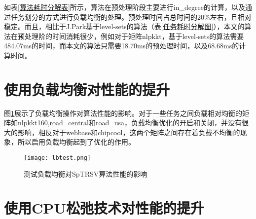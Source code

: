 \begin{table}[htbp]
    \scriptsize
    \caption{算法耗时分解表}
    \label{算法耗时分解表}
\end{table}

如表\ref{算法耗时分解表}所示，算法在预处理阶段主要进行in\_degree的计算，以及通过任务划分的方式进行负载均衡的处理。预处理时间占总时间的20\%左右，且相对稳定。而且，相比于J.Park\cite{park2014sparsifying}基于level-sets的算法（表\ref{任务耗时分解图}），本文的算法在预处理阶的时间消耗很少，例如对于矩阵nlpkkt，基于level-sets的算法需要484.07ms的时间，而本文的算法只需要18.70ms的预处理时间，以及68.68ms的计算时间。


\section{使用负载均衡对性能的提升}

图\ref{测试负载均衡对SpTRSV算法性能的影响}展示了负载均衡操作对算法性能的影响。对于一些任务之间负载相对均衡的矩阵如nlpkkt160,road\_central和road\_usa，负载均衡优化的开启和关闭，并没有很大的影响，相反对于webbase和chipcool，这两个矩阵之间存在着负载不均衡的现象，所以启用负载均衡起到了优化的作用。

\begin{figure}[htbp]
    \centering
    \texttt{[image: lbtest.png]}
    \caption{测试负载均衡对SpTRSV算法性能的影响}
    \label{测试负载均衡对SpTRSV算法性能的影响}
\end{figure}

\section{使用CPU松弛技术对性能的提升}

